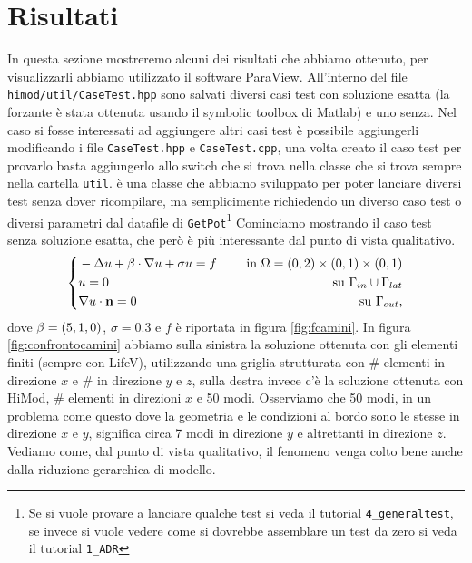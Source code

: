 \chapter{Risultati}
In questa sezione mostreremo alcuni dei risultati che abbiamo ottenuto, per visualizzarli abbiamo utilizzato
il software ParaView.
All'interno del file \texttt{himod/util/CaseTest.hpp} sono salvati diversi casi test
con soluzione esatta (la forzante \`e stata ottenuta usando il symbolic toolbox di Matlab) e uno senza.
Nel caso si fosse interessati ad aggiungere altri casi test \`e possibile aggiungerli modificando i
file \texttt{CaseTest.hpp} e \texttt{CaseTest.cpp}, una volta creato il caso test 
per provarlo basta aggiungerlo allo switch che si trova nella classe  che si trova sempre nella
cartella \texttt{util}.  \`e una classe che abbiamo sviluppato per poter
lanciare diversi test senza dover ricompilare, ma semplicimente richiedendo un diverso caso test o diversi 
parametri dal datafile di \texttt{GetPot}\footnote{Se si vuole provare a lanciare qualche test si veda il tutorial
\texttt{4\_generaltest}, se invece si vuole vedere come si dovrebbe assemblare un test da zero si veda il tutorial \texttt{1\_ADR} }
Cominciamo mostrando il caso test senza soluzione esatta, che per\`o \`e pi\`u interessante dal punto di vista qualitativo.
\begin{equation}
 \label{eq:camini}
 \left\{
\begin{aligned}
 &-\Delta u + \mathbf{\beta}\cdot\nabla u + \sigma u = f &\quad \text{ in }\Omega=(0,2)\times(0,1)\times(0,1)\\
 &u=0 &\quad \text{ su } \Gamma_{in} \cup \Gamma_{lat}\\
 &\nabla u\cdot \mathbf{n} = 0 &\quad \text{ su } \Gamma_{out},
\end{aligned}
\right.
\end{equation}
dove $\mathbf{\beta}=(5,1,0)$, $\sigma=0.3$ e $f$ \`e riportata in figura \ref{fig:fcamini}.
In figura \ref{fig:confrontocamini} abbiamo sulla sinistra la soluzione ottenuta con 
gli elementi finiti (sempre con LifeV), utilizzando una griglia strutturata con \# elementi in direzione $x$
e \# in direzione $y$ e $z$, sulla destra invece c'\`e la soluzione ottenuta con HiMod, \# elementi in direzioni $x$
e 50 modi. Osserviamo che 50 modi, in un problema come questo dove la geometria e le condizioni al bordo sono le stesse in direzione
$x$ e $y$, significa circa 7 modi in direzione $y$ e altrettanti in direzione $z$.
Vediamo come, dal punto di vista qualitativo, il fenomeno venga colto bene anche dalla riduzione gerarchica di modello.

